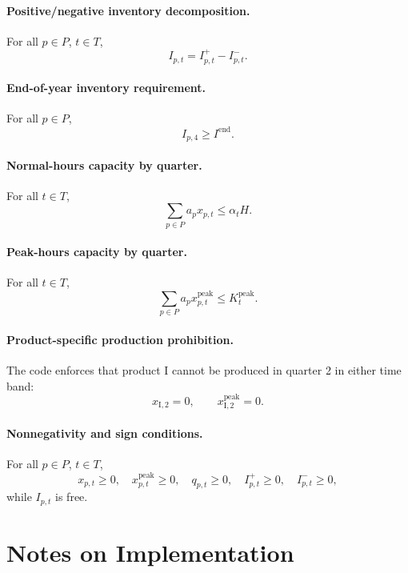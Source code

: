 \paragraph{Positive/negative inventory decomposition.}
For all \(p\in P\), \(t\in T\),
\[
I_{p,t}=I^+_{p,t}-I^-_{p,t}.
\]

\paragraph{End-of-year inventory requirement.}
For all \(p\in P\),
\[
I_{p,4}\ge I^{\mathrm{end}}.
\]

\paragraph{Normal-hours capacity by quarter.}
For all \(t\in T\),
\[
\sum_{p\in P} a_p x_{p,t}\le \alpha_t H.
\]

\paragraph{Peak-hours capacity by quarter.}
For all \(t\in T\),
\[
\sum_{p\in P} a_p x^{\mathrm{peak}}_{p,t}\le K_t^{\mathrm{peak}}.
\]

\paragraph{Product-specific production prohibition.}
The code enforces that product I cannot be produced in quarter 2 in either time band:
\[
x_{\mathrm{I},2}=0,\qquad x^{\mathrm{peak}}_{\mathrm{I},2}=0.
\]

\paragraph{Nonnegativity and sign conditions.}
For all \(p\in P\), \(t\in T\),
\[
x_{p,t}\ge 0,\quad x^{\mathrm{peak}}_{p,t}\ge 0,\quad q_{p,t}\ge 0,\quad I^+_{p,t}\ge 0,\quad I^-_{p,t}\ge 0,
\]
while \(I_{p,t}\) is free.

\section*{Notes on Implementation}

